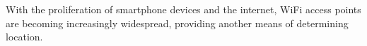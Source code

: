 

%



With the proliferation of smartphone devices and the internet,
WiFi access points are becoming increasingly widespread, 
providing another means of determining location.


